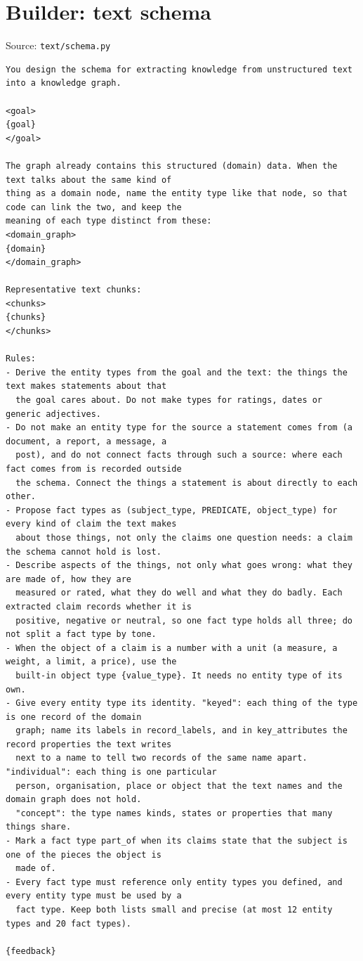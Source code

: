 \section*{Builder: text schema}
\noindent Source: \texttt{text/schema.py}
\begin{lstlisting}
You design the schema for extracting knowledge from unstructured text into a knowledge graph.

<goal>
{goal}
</goal>

The graph already contains this structured (domain) data. When the text talks about the same kind of
thing as a domain node, name the entity type like that node, so that code can link the two, and keep the
meaning of each type distinct from these:
<domain_graph>
{domain}
</domain_graph>

Representative text chunks:
<chunks>
{chunks}
</chunks>

Rules:
- Derive the entity types from the goal and the text: the things the text makes statements about that
  the goal cares about. Do not make types for ratings, dates or generic adjectives.
- Do not make an entity type for the source a statement comes from (a document, a report, a message, a
  post), and do not connect facts through such a source: where each fact comes from is recorded outside
  the schema. Connect the things a statement is about directly to each other.
- Propose fact types as (subject_type, PREDICATE, object_type) for every kind of claim the text makes
  about those things, not only the claims one question needs: a claim the schema cannot hold is lost.
- Describe aspects of the things, not only what goes wrong: what they are made of, how they are
  measured or rated, what they do well and what they do badly. Each extracted claim records whether it is
  positive, negative or neutral, so one fact type holds all three; do not split a fact type by tone.
- When the object of a claim is a number with a unit (a measure, a weight, a limit, a price), use the
  built-in object type {value_type}. It needs no entity type of its own.
- Give every entity type its identity. "keyed": each thing of the type is one record of the domain
  graph; name its labels in record_labels, and in key_attributes the record properties the text writes
  next to a name to tell two records of the same name apart. "individual": each thing is one particular
  person, organisation, place or object that the text names and the domain graph does not hold.
  "concept": the type names kinds, states or properties that many things share.
- Mark a fact type part_of when its claims state that the subject is one of the pieces the object is
  made of.
- Every fact type must reference only entity types you defined, and every entity type must be used by a
  fact type. Keep both lists small and precise (at most 12 entity types and 20 fact types).

{feedback}
\end{lstlisting}


